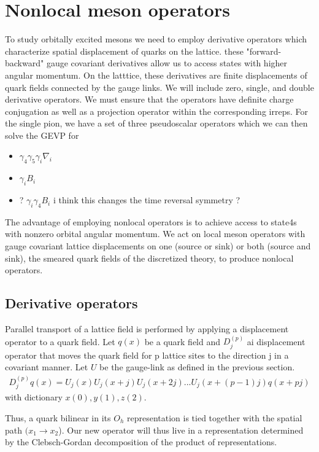 \section{Nonlocal meson operators}
To study orbitally excited mesons we need to employ derivative operators which characterize spatial displacement of quarks on the lattice.
these "forward-backward" gauge covariant derivatives allow us to access states with higher angular momentum. On the latttice, these derivatives are finite displacements of quark fields connected by the gauge links. We will include zero, single, and double derivative operators. We must ensure that the operators have definite charge conjugation as well as a projection operator within the corresponding irreps. \cite{liao2002excitedcharmoniumspectrumanisotropic}
For the single pion, we have a set of three pseudoscalar operators which we can then solve the GEVP for
\begin{itemize} 
    \item $\gamma_4\gamma_5\gamma_i \nabla_i$
    \item $\gamma_iB_i$ 
    \item ? $\gamma_i\gamma_4B_i$ i think this changes the time reversal symmetry ? 
    
\end{itemize}
The advantage of employing nonlocal operators is to achieve access to state4s with nonzero orbital angular momentum. We act on local meson operators with gauge covariant lattice displacements on one (source or sink) or both (source and sink), the smeared quark fields of the discretized theory, to produce nonlocal operators. 

\subsection{Derivative operators}
Parallel transport of a lattice field is performed by applying a displacement operator to a quark field.  Let $q(x)$ be a quark field and $D_j^{(p)}$ ai displacement operator that moves the quark field for p lattice sites to the direction j in a covariant manner. Let $U$ be the gauge-link as defined in the previous section.
\begin{align}
    D_j^{(p)} q(x) = U_j(x) U_j(x+j) U_j(x+2j)...U_j(x+(p-1)j) q(x+pj)
\end{align}
with dictionary $x(0), y(1), z(2)$.

Thus, a quark bilinear in its $O_h$ representation is tied together with the spatial path $(x_1 \to x_2$). Our new operator will thus live in a representation determined by the Clebsch-Gordan decomposition of the product of representations. 

